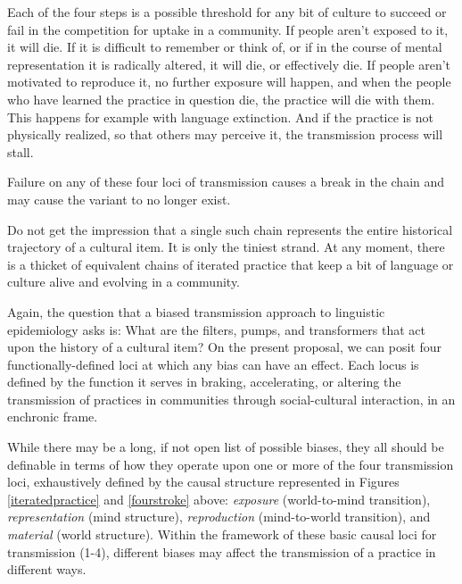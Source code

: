Each of the four steps is a possible threshold for any bit 
of culture to succeed or fail in the competition for uptake in a community. If people aren't exposed to it, it will die. If it is 
difficult to remember or think of, or if in the course of mental 
representation it is radically altered, it will die, or effectively die. 
If people aren't motivated to reproduce it, no further exposure will 
happen, and when the people who have learned the practice in question die, the practice will die with them. This happens for example with language 
extinction. And if the practice is not physically realized, so that others may perceive it, the transmission process will 
stall. 



Failure on any of these four loci of transmission causes a break in the 
chain and may cause the variant to no longer exist. 



Do not get the impression that a single such chain 
represents the entire historical trajectory of a cultural item. It is 
only the tiniest strand. At any moment, there is a thicket of equivalent 
chains of iterated practice that keep a bit of language or culture alive and evolving in 
a community. 



Again, the question that a biased transmission approach 
to linguistic epidemiology asks is: What are the filters, 
pumps, and transformers that act upon the history of a cultural item? On the present proposal, we 
can posit four functionally-defined loci at which any bias can have an 
effect. Each locus is defined by the function it serves in braking, accelerating, or altering the transmission of practices in communities 
through social-cultural interaction, in an enchronic frame. 



While there may be a long, if not open list of possible biases, they all 
should be definable in terms of how they operate upon one or more of the four 
transmission loci, exhaustively defined by the causal structure 
represented in Figures \ref{iteratedpractice} and \ref{fourstroke} above: \textit{exposure} (world-to-mind transition), 
\textit{representation} (mind structure), \textit{reproduction} (mind-to-world 
transition), and \textit{material} (world structure). Within the framework of 
these basic causal loci for transmission (1-4), different biases may affect the transmission of a practice in different ways. 



